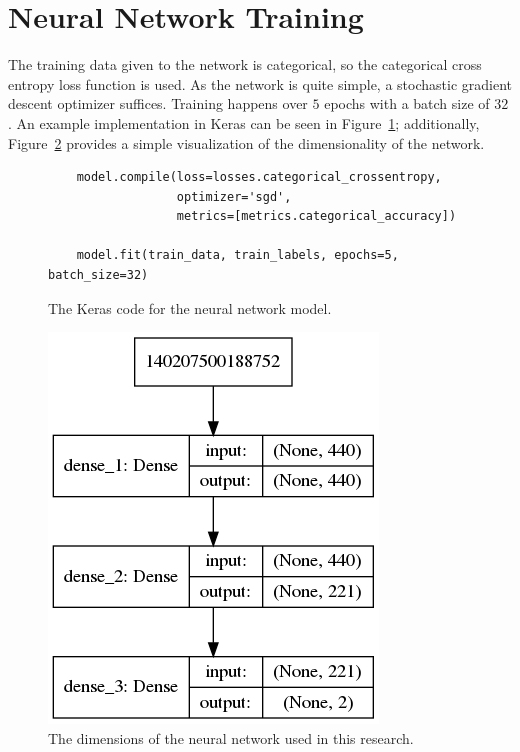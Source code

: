 \documentclass[]{report}
\begin{document}
\FloatBarrier
\section{Neural Network Training}

The training data given to the network is categorical, so the categorical cross entropy loss
function is used. As the network is quite simple, a stochastic gradient descent optimizer suffices.
Training happens over $5$ epochs with a batch size of $32$. An example implementation in Keras can
be seen in Figure~\ref{fig:code_for_training}; additionally, Figure~\ref{fig:neural_network_model}
provides a simple visualization of the dimensionality of the network.

\begin{figure}[h]
    \centering
    \begin{verbatim}
    model.compile(loss=losses.categorical_crossentropy,
                  optimizer='sgd',
                  metrics=[metrics.categorical_accuracy])
    
    model.fit(train_data, train_labels, epochs=5, batch_size=32)
    \end{verbatim}
    \caption{The Keras code for the neural network model.}
    \label{fig:code_for_training}
\end{figure}

\begin{figure}[h]
    \centering
    \includegraphics[scale=0.5]{figures/neural_network_model.png}
    \caption[]{The dimensions of the neural network used in this research.}
    \label{fig:neural_network_model}
\end{figure}
\end{document}
